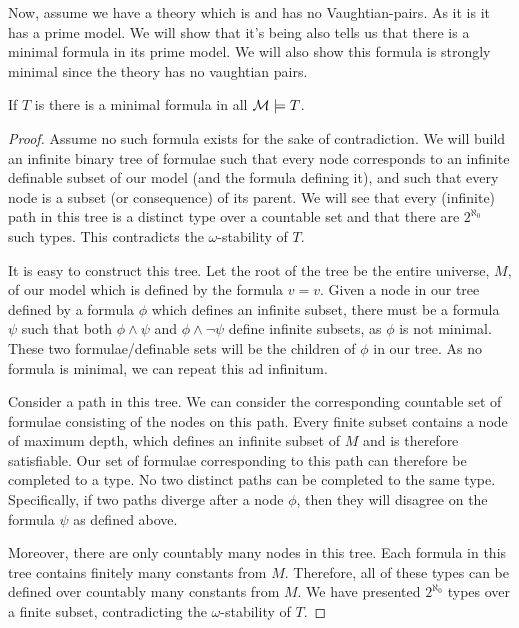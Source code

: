 Now, assume we have a theory which is \omst and has no Vaughtian-pairs. 
As it is \omst it has a prime model.
We will show that it's being \omst also tells us that there is a minimal formula in its prime model.
We will also show this formula is strongly minimal since the theory has no vaughtian pairs. 

\begin{lemma}\label{lemma_minimal_omst}
If \(T\) is \omst there is a minimal formula in all \(\mathcal{M} \models T\).
\end{lemma}

\begin{proof}\label{proof_minimal_omst}
Assume no such formula exists for the sake of contradiction. 
We will build an infinite binary tree of formulae such that 
every node corresponds to an infinite definable subset of our model (and the formula defining it), 
and such that every node is a subset (or consequence) of its parent. 
We will see that every (infinite) path in this tree is a distinct type over a countable set and that there are \(2^{\aleph_0}\) such types. 
This contradicts the \(\omega\)-stability of \(T\).

It is easy to construct this tree. Let the root of the tree be the entire universe, \(M\), of our model which is defined by the formula \(v = v\).
Given a node in our tree defined by a formula \(\phi\) which defines an infinite subset, there must be a formula \(\psi\) such that both \(\phi \land \psi\) and \(\phi \land \neg \psi\) define infinite subsets, as \(\phi\) is not minimal. 
These two formulae/definable sets will be the children of \(\phi\) in our tree. 
As no formula is minimal, we can repeat this ad infinitum. 

Consider a path in this tree. We can consider the corresponding countable set of formulae consisting of the nodes on this path. 
Every finite subset contains a node of maximum depth, which defines an infinite subset of \(M\) and is therefore satisfiable. 
Our set of formulae corresponding to this path can therefore be completed to a type.
No two distinct paths can be completed to the same type. 
Specifically, if two paths diverge after a node \(\phi\), then they will disagree on the formula \(\psi\) as defined above. 

Moreover, there are only countably many nodes in this tree. 
Each formula in this tree contains finitely many constants from \(M\).
Therefore, all of these types can be defined over countably many constants from \(M\). 
We have presented \(2^{\aleph_0}\) types over a finite subset, contradicting the \(\omega\)-stability of \(T\).
\end{proof}

